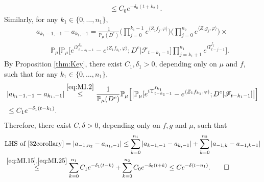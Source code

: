 \documentclass{amse-new}
\numberwithin{equation}{section}
\begin{document}
\begin{prof}
\begin{align}
    \\&\label{eq:MI.15} \leq C_0 e^{-\delta_0 (t+k_2)}.
\end{align}
	Similarly, for any $k_1 \in \{0, \dots , n_1\}$,
\begin{equation}
\label{eq:MI.2}
\begin{multlined}
	a_{k_1-1,-1} - a_{k_1,-1}
	=  \frac{1}{\mathbb P_\mu(D^c)} \Big(\prod_{j=0}^{k_1-1}e^{\langle Z_1 f_j, \varphi\rangle}\Big) \Big(\prod_{j=0}^{n_2} e^{ \langle Z_1g_j,\varphi \rangle} \Big) \times {}
	\\ \qquad \mathbb{P}_{\mu}\Big[ \mathbb P_\mu\big[e^{i\Upsilon_{t-k_1-1}^{f_{k_1}}} -e^{\langle Z_1 f_{k_1}, \varphi\rangle}  ; D^c \big| \mathscr F_{t-k_1 - 1}\big] \prod_{j=k_1+1}^{n_1} e^{i\Upsilon_{t-j-1}^{f_j}} \Big] .
\end{multlined}
\end{equation}
	By Proposition \ref{thm:Key}, there exist $C_1,\delta_1 >0$, depending only on $\mu$ and $f$, such that for any $k_1 \in \{0,\dots,n_1\}$,
\begin{align}
    &| a_{k_1-1,-1} - a_{k_1,-1}|
    \overset{\eqref{eq:MI.2}}\leq \frac{1}{\mathbb{P}_{\mu}(D^c)}\mathbb{P}_{\mu}\Big[\big|\mathbb P_\mu[e^{i\Upsilon^{f_{k_1}}_{t-k_1-1}}-e^{\langle Z_1f_{k_1}, \varphi\rangle}; D^c|\mathscr F_{t-k_1-1}]\big|\Big]
    \\&\label{eq:MI.25} \leq C_1 e^{-\delta_1 (t-k_1)}.
\end{align}
	Therefore, there exist $C,\delta >0$, depending only on $f,g$ and $\mu$, such that
\begin{align}
    &\text{LHS of \eqref{32corollary}}
    = \left|a_{-1,n_2}-a_{n_1,-1}\right|
    \leq \sum_{k=0}^{n_1}\left|a_{k-1,-1}-a_{k,-1}\right|+\sum_{k=0}^{n_2}\left|a_{-1,k}-a_{-1,k-1}\right|
    \\& \overset{\eqref{eq:MI.15},\eqref{eq:MI.25}}\leq \sum_{k=0}^{n_1} C_1 e^{-\delta_1 (t-k)}+\sum_{k=0}^{n_2} C_0 e^{-\delta_0 (t+k)}
  	\leq C e^{- \delta (t-n_1)}.
    \qedhere
\end{align}
\end{prof}
\end{document}
